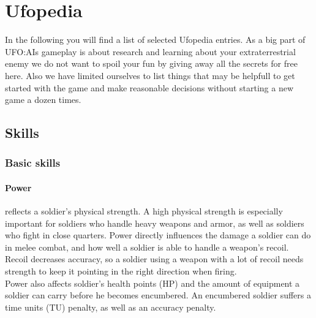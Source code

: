 
%
%


\section{Ufopedia}
In the following you will find a list of selected Ufopedia entries. As a big part of UFO:AIs gameplay is about research and learning about your extraterrestrial enemy we do not want to spoil your fun by giving away all the secrets for free here. Also we have limited ourselves to list things that may be helpfull to get started with the game and make reasonable decisions without starting a new game a dozen times.

\subsection{Skills}
\subsubsection{Basic skills}
\paragraph*{Power}
 reflects a soldier's physical strength. A high physical strength is especially important for soldiers who handle heavy weapons and armor, as well as soldiers who fight in close quarters. Power directly influences the damage a soldier can do in melee combat, and how well a soldier is able to handle a weapon's recoil. Recoil decreases accuracy, so a soldier using a weapon with a lot of recoil needs strength to keep it pointing in the right direction when firing.\\
Power also affects soldier's health points (HP) and the amount of equipment a soldier can carry before he becomes encumbered. An encumbered soldier suffers a time units (TU) penalty, as well as an accuracy penalty.
